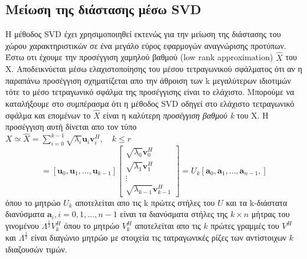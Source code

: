 \subsection{Μείωση της διάστασης μέσω \textlatin{SVD}}
\par
Η μέθοδος \textlatin{SVD} έχει χρησιμοποιηθεί εκτενώς για την μείωση της διάστασης του χώρου χαρακτηριστικών σε ένα μεγάλο εύρος εφαρμογών αναγνώρισης προτύπων. Έστω οτι έχουμε την προσέγγιση χαμηλού βαθμού \textlatin{(low rank approximation)} $ \hat{X} $ του \textlatin{X}. Αποδεικνύεται μέσω ελαχιστοποίησης του μέσου τετραγωνικού σφάλματος ότι αν η παραπάνω προσέγγιση σχηματίζεται απο την άθροιση των \textlatin{k} μεγαλύτερων ιδιοτιμών τότε το μέσο τετραγωνικό σφάλμα της προσέγγισης είναι το ελάχιστο. Μπορούμε να καταλήξουμε στο συμπέρασμα ότι η μέθοδος \textlatin{SVD} οδηγεί στο ελάχιστο τετραγωνικό σφάλμα και επομένων το $ \hat{X} $ είναι η καλύτερη \textit{προσέγγιση βαθμού \textlatin{k}} του \textlatin{X}. Η προσέγγιση αυτή δίνεται απο τον τύπο \\
\newline\hspace*{\fill}
$ X \simeq \hat{X} = \sum_{i=0}^{k-1} \sqrt{\lambda_{i}} \mathbf{u}_{i}\mathbf{v}_{i}^{H},\quad k \leq r $
\hspace*{\fill}\newline
\newline\hspace*{\fill}
\begin{equation}
	= [\mathbf{u}_{0},\mathbf{u}_{1},\ldots,\mathbf{u}_{k-1}]
	\begin{bmatrix}
	\sqrt{\lambda_{0}}\mathbf{v}_{0}^{H} \\
	\sqrt{\lambda_{1}}\mathbf{v}_{1}^{H} \\
	\vdots \\ 
	\sqrt{\lambda_{k-1}}\mathbf{v}_{k-1}^{H}
	\end{bmatrix} 
	= U_{k}[\mathbf{a}_{0},\mathbf{a}_{1},\ldots,\mathbf{a}_{n-1},]
\end{equation}
\hspace*{\fill}\newline
όπου το μητρώο $U_{k}$ αποτελείται απο τις \textlatin{k} πρώτες στήλες του $U$ και τα \textlatin{k}-διάστατα διανύσματα $\mathbf{a}_{i},i=0,1,\ldots,n-1$ είναι τα διανύσματα στήλες της $k \times n$ μήτρας του γινομένου $ \Lambda^{\frac{1}{2}}V_{k}^{H}$ όπου το μητρώο $V_{k}^{H}$ αποτελείται απο τις $k$ πρώτες γραμμές του $V^{H}$ και $ \Lambda^{\frac{1}{2}} $ είναι διαγώνιο μητρώο με στοιχεία τις τατραγωνικές ρίζες των αντίστοιχων $k$ ιδιαζουσών τιμών.
